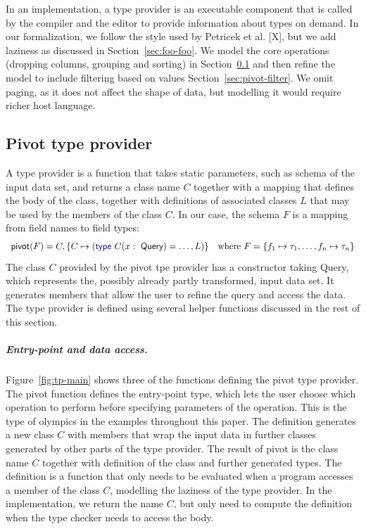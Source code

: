 \documentclass[a4paper,UKenglish]{lipics-v2016}
\theoremstyle{plain}
\theoremstyle{definition}
\newcommand{\ball}[1]{\FPeval{\result}{clip(201+#1)}\textnormal{\ding{\result}}}
\newcommand{\kvd}[1]{\textnormal{\textcolor{kvdclr}{\sffamily #1}}}
\newcommand{\ident}[1]{\textnormal{\sffamily #1}}
\begin{document}
In an implementation, a type provider is an executable component that is called by the compiler
and the editor to provide information about types on demand. In our formalization, we follow the 
style used by Petricek et al. [X], but we add laziness as discussed in Section~\ref{sec:foo-foo}.
We model the core operations (dropping columns, grouping and sorting) in Section~\ref{sec:pivot-core}
and then refine the model to include filtering based on values Section~\ref{sec:pivot-filter}.
We omit paging, as it does not affect the shape of data, but modelling it would require richer 
host language.


\subsection{Pivot type provider}
\label{sec:pivot-core}

A type provider is a function that takes static parameters, such as schema of the input data set, 
and returns a class name $C$ together with a mapping that defines the body of the class, together 
with definitions of associated classes $L$ that may be used by the members of the class $C$. 
In our case, the schema $F$ is a mapping from field names to field types:
%
\begin{equation*}
\begin{array}{l}
\ident{pivot}(F) = C, \{ C \mapsto (\kvd{type}~C(x:\ident{Query}) = \ldots,L) \} \quad \textnormal{where}~F=\{ f_1 \mapsto \tau_1, \ldots, f_n \mapsto \tau_n \}
\end{array}
\end{equation*}
%
The class $C$ provided by the pivot tpe provider has a constructor taking \ident{Query}, which 
represents the, possibly already partly transformed, input data set. It generates members that
allow the user to refine the query and access the data. The type provider is defined using several
helper functions discussed in the rest of this section.

\subparagraph{Entry-point and data access.} Figure~\ref{fig:tp-main} shows three of the functions
defining the pivot type provider. The \ident{pivot} function \ball{1} defines the entry-point type, 
which lets the user choose which operation to perform before specifying parameters of the operation. 
This is the type of \ident{olympics} in the examples throughout this paper. The definition generates 
a new class $C$ with members that wrap the input data in further classes generated by other parts
of the type provider. The result of \ident{pivot} is the class name $C$ together with definition of 
the class and further generated types. The definition is a function that only needs to be evaluated 
when a program accesses a member of the class $C$, modelling the laziness of the type provider.
In the implementation, we return the name $C$, but only need to compute the definition when the 
type checker needs to access the body.
\end{document}
